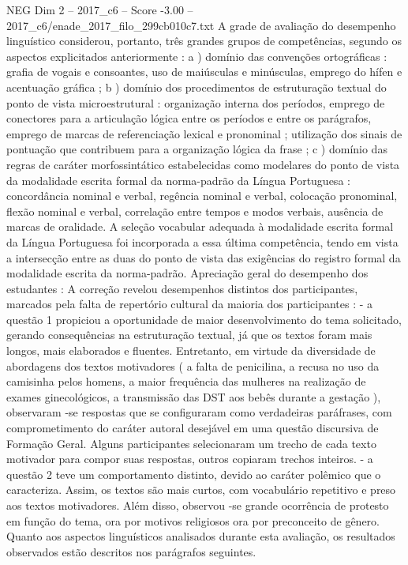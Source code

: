 \begin{textsample}{NEG Dim 2 – 2017\_c6 – Score -3.00 – 2017\_c6/enade\_2017\_filo\_299cb010c7.txt}
A grade de avaliação do desempenho linguístico considerou, portanto, três grandes grupos de competências, segundo os aspectos explicitados anteriormente : a ) domínio das convenções ortográficas : grafia de vogais e consoantes, uso de maiúsculas e minúsculas, emprego do hífen e acentuação gráfica ; b ) domínio dos procedimentos de estruturação textual do ponto de vista microestrutural : organização interna dos períodos, emprego de conectores para a articulação lógica entre os períodos e entre os parágrafos, emprego de marcas de referenciação lexical e pronominal ; utilização dos sinais de pontuação que contribuem para a organização lógica da frase ; c ) domínio das regras de caráter morfossintático estabelecidas como modelares do ponto de vista da modalidade escrita formal da norma-padrão da Língua Portuguesa : concordância nominal e verbal, regência nominal e verbal, colocação pronominal, flexão nominal e verbal, correlação entre tempos e modos verbais, ausência de marcas de oralidade.
A seleção vocabular adequada à modalidade escrita formal da Língua Portuguesa foi incorporada a essa última competência, tendo em vista a intersecção entre as duas do ponto de vista das exigências do registro formal da modalidade escrita da norma-padrão.
Apreciação geral do desempenho dos estudantes : A correção revelou desempenhos distintos dos participantes, marcados pela falta de repertório cultural da maioria dos participantes : - a questão 1 propiciou a oportunidade de maior desenvolvimento do tema solicitado, gerando consequências na estruturação textual, já que os textos foram mais longos, mais elaborados e fluentes.
Entretanto, em virtude da diversidade de abordagens dos textos motivadores ( a falta de penicilina, a recusa no uso da camisinha pelos homens, a maior frequência das mulheres na realização de exames ginecológicos, a transmissão das DST aos bebês durante a gestação ), observaram -se respostas que se configuraram como verdadeiras paráfrases, com comprometimento do caráter autoral desejável em uma questão discursiva de Formação Geral.
Alguns participantes selecionaram um trecho de cada texto motivador para compor suas respostas, outros copiaram trechos inteiros. - a questão 2 teve um comportamento distinto, devido ao caráter polêmico que o caracteriza.
Assim, os textos são mais curtos, com vocabulário repetitivo e preso aos textos motivadores.
Além disso, observou -se grande ocorrência de protesto em função do tema, ora por motivos religiosos ora por preconceito de gênero.
Quanto aos aspectos linguísticos analisados durante esta avaliação, os resultados observados estão descritos nos parágrafos seguintes.

\end{textsample}
